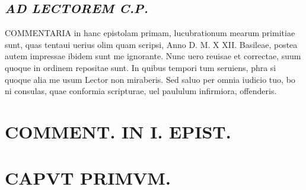 \documentclass{article}
\begin{document}
\begin{pages}
\subsection*{\textit{AD LECTOREM C.P. }}\pstart COMMENTARIA in hanc epistolam primam, lucubrationum mearum primitiae sunt, quas tentaui uerius olim quam scripsi, Anno D. M. X XII. Basileae, postea autem impressae ibidem sunt me ignorante. Nunc uero reuisae et correctae, suum quoque in ordinem repositae sunt. In quibus tempori tum seruiens, phra si quoque alia me usum Lector non miraberis. Sed saluo per omnia iudicio tuo, bo ni consulas, quae conformia scripturae, uel paululum infirmiora, offenderis.  \pend
\section*{COMMENT. IN I. EPIST. }
\marginpar{[ p.464 ]}
\section{CAPVT PRIMVM.}
{}

\end{pages}
\end{document}

